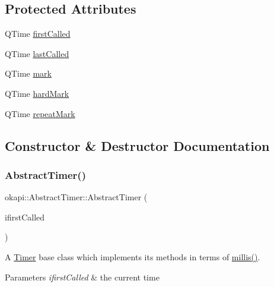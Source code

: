 \subsection*{Protected Attributes}
\begin{DoxyCompactItemize}
\item 
Q\+Time \mbox{\hyperlink{classokapi_1_1AbstractTimer_ace6c48ceaa4736cca3d34345fc8a9f5b}{first\+Called}}
\item 
Q\+Time \mbox{\hyperlink{classokapi_1_1AbstractTimer_aaac21f537a3729ac5d73bf13792b2e8a}{last\+Called}}
\item 
Q\+Time \mbox{\hyperlink{classokapi_1_1AbstractTimer_ab33f65dd0d151c890307a86449eb74fc}{mark}}
\item 
Q\+Time \mbox{\hyperlink{classokapi_1_1AbstractTimer_a306968ddbbae48420a16ac42de9bca1f}{hard\+Mark}}
\item 
Q\+Time \mbox{\hyperlink{classokapi_1_1AbstractTimer_ae3d1fd628749051d0b90b066bccd4e2b}{repeat\+Mark}}
\end{DoxyCompactItemize}


\subsection{Constructor \& Destructor Documentation}
\mbox{\label{classokapi_1_1AbstractTimer_aec03f7e11e25f300ec1fd44aaff3596f}} 
\subsubsection{\texorpdfstring{AbstractTimer()}{AbstractTimer()}}
{\footnotesize\ttfamily okapi\+::\+Abstract\+Timer\+::\+Abstract\+Timer (\begin{DoxyParamCaption}\item[{Q\+Time}]{ifirst\+Called }\end{DoxyParamCaption})\hspace{0.3cm}{\ttfamily [explicit]}}

A \mbox{\hyperlink{classokapi_1_1Timer}{Timer}} base class which implements its methods in terms of \mbox{\hyperlink{classokapi_1_1AbstractTimer_a6871e119f74d8b6a8c928244e837e762}{millis()}}.


\begin{DoxyParams}{Parameters}
{\em ifirst\+Called} & the current time \\
\hline
\end{DoxyParams}
\mbox{\label{classokapi_1_1AbstractTimer_a720f854545bab2158135149174758736}} 
